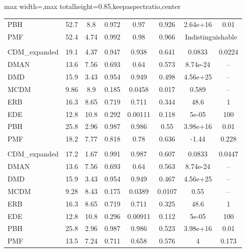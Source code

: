 \begin{table}[p]
\begin{adjustbox}{max width=\textwidth,max totalheight=0.85\textheight,keepaspectratio,center}
\begin{tabular}{lccccccc}
PBH & 52.7 & 8.8 & 0.972 & 0.97 & 0.926 & 2.64e+16 & 0.01 \\
\rowcolor{gray!10}
PMF & 52.4 & 4.74 & 0.992 & 0.98 & 0.966 & \multicolumn{2}{c}{Indistinguishable} \\
\addlinespace[4pt]
\midrule
\multicolumn{8}{c}{\textbf{Foreground Scenario: 0.01\%}} \\
\addlinespace[2pt]
CDM\_expanded & 19.1 & 4.37 & 0.947 & 0.938 & 0.641 & 0.0833 & 0.0224 \\
DMAN & 13.6 & 7.56 & 0.693 & 0.64 & 0.573 & 8.74e-24 & -- \\
DMD & 15.9 & 3.43 & 0.954 & 0.949 & 0.498 & 4.56e+25 & -- \\
MCDM & 9.86 & 8.9 & 0.185 & 0.0458 & 0.017 & 0.589 & -- \\
ERB & 16.3 & 8.65 & 0.719 & 0.711 & 0.344 & 48.6 & 1 \\
EDE & 12.8 & 10.8 & 0.292 & 0.00111 & 0.118 & 5e-05 & 100 \\
PBH & 25.8 & 2.96 & 0.987 & 0.986 & 0.55 & 3.98e+16 & 0.01 \\
PMF & 18.2 & 7.77 & 0.818 & 0.78 & 0.636 & -1.44 & 0.228 \\
\addlinespace[4pt]
\midrule
\multicolumn{8}{c}{\textbf{Foreground Scenario: 0.0001\%}} \\
\addlinespace[2pt]
CDM\_expanded & 17.2 & 1.67 & 0.991 & 0.987 & 0.607 & 0.0833 & 0.0447 \\
DMAN & 13.6 & 7.56 & 0.693 & 0.64 & 0.563 & 8.74e-24 & -- \\
DMD & 15.9 & 3.43 & 0.954 & 0.949 & 0.467 & 4.56e+25 & -- \\
MCDM & 9.28 & 8.43 & 0.175 & 0.0389 & 0.0107 & 0.55 & -- \\
ERB & 16.3 & 8.65 & 0.719 & 0.711 & 0.325 & 48.6 & 1 \\
EDE & 12.8 & 10.8 & 0.296 & 0.00911 & 0.112 & 5e-05 & 100 \\
PBH & 25.8 & 2.96 & 0.987 & 0.986 & 0.523 & 3.98e+16 & 0.01 \\
PMF & 13.5 & 7.24 & 0.711 & 0.658 & 0.576 & 4 & 0.173 \\
\bottomrule
\end{tabular}
\end{adjustbox}
\endgroup
\end{table}
